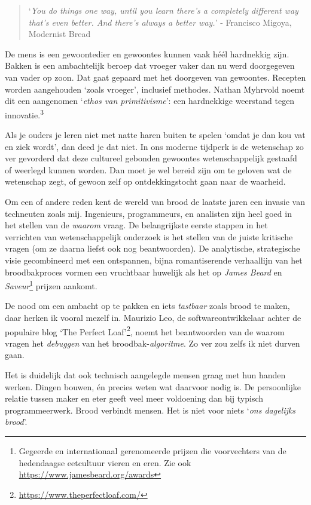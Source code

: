 \documentclass[
  11pt,
  dutch,
]{memoir}
\begin{document}
\begin{quote}
`\emph{You do things one way, until you learn there's a completely
different way that's even better. And there's always a better way.}' -
Francisco Migoya, Modernist Bread
\end{quote}

De mens is een gewoontedier en gewoontes kunnen vaak héél hardnekkig
zijn. Bakken is een ambachtelijk beroep dat vroeger vaker dan nu werd
doorgegeven van vader op zoon. Dat gaat gepaard met het doorgeven van
gewoontes. Recepten worden aangehouden `zoals vroeger', inclusief
methodes. Nathan Myhrvold noemt dit een aangenomen `\emph{ethos van
primitivisme}': een hardnekkige weerstand tegen
innovatie.\textsuperscript{3}

Als je ouders je leren niet met natte haren buiten te spelen `omdat je
dan kou vat en ziek wordt', dan deed je dat niet. In ons moderne
tijdperk is de wetenschap zo ver gevorderd dat deze cultureel gebonden
gewoontes wetenschappelijk gestaafd of weerlegd kunnen worden. Dan moet
je wel bereid zijn om te geloven wat de wetenschap zegt, of gewoon zelf
op ontdekkingstocht gaan naar de waarheid.

Om een of andere reden kent de wereld van brood de laatste jaren een
invasie van techneuten zoals mij. Ingenieurs, programmeurs, en analisten
zijn heel goed in het stellen van de \emph{waarom} vraag. De
belangrijkste eerste stappen in het verrichten van wetenschappelijk
onderzoek is het stellen van de juiste kritische vragen (om ze daarna
liefst ook nog beantwoorden). De analytische, strategische visie
gecombineerd met een ontspannen, bijna romantiserende verhaallijn van
het broodbakproces vormen een vruchtbaar huwelijk als het op \emph{James
Beard} en \emph{Saveur}\footnote{Gegeerde en internationaal gerenomeerde
  prijzen die voorvechters van de hedendaagse eetcultuur vieren en eren.
  Zie ook \url{https://www.jamesbeard.org/awards}} prijzen aankomt.

De nood om een ambacht op te pakken en iets \emph{tastbaar} zoals brood
te maken, daar herken ik vooral mezelf in. Maurizio Leo, de
softwareontwikkelaar achter de populaire blog `The Perfect
Loaf'\footnote{\url{https://www.theperfectloaf.com/}}, noemt het
beantwoorden van de waarom vragen het \emph{debuggen} van het
broodbak-\emph{algoritme}. Zo ver zou zelfs ik niet durven gaan.

Het is duidelijk dat ook technisch aangelegde mensen graag met hun
handen werken. Dingen bouwen, én precies weten wat daarvoor nodig is. De
persoonlijke relatie tussen maker en eter geeft veel meer voldoening dan
bij typisch programmeerwerk. Brood verbindt mensen. Het is niet voor
niets `\emph{ons dagelijks brood}'.
\end{document}

